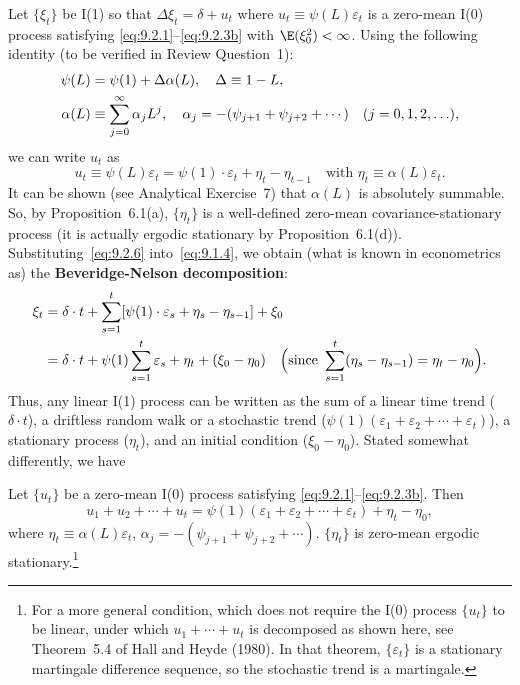 Let $\{\xi_t\}$ be I(1) so that $\Delta \xi_t = \delta + u_t$ where $u_t \equiv \psi(L)\varepsilon_t$ is a zero-mean I(0)
process satisfying \eqref{eq:9.2.1}--\eqref{eq:9.2.3b} with $\E(\xi_0^2) < \infty$. Using the following identity
(to be verified in Review Question~1):
\begin{align}
\psi(L) &= \psi(1) + \Delta \alpha(L), \quad \Delta \equiv 1 - L, \notag \\
\alpha(L) &\equiv \sum_{j=0}^{\infty} \alpha_j L^j, \quad
\alpha_j = -(\psi_{j+1} + \psi_{j+2} + \cdots) \quad (j = 0, 1, 2, \ldots),
\label{eq:9.2.5}
\end{align}
we can write $u_t$ as
\begin{equation}
\label{eq:9.2.6}
u_t \equiv \psi(L)\varepsilon_t = \psi(1) \cdot \varepsilon_t + \eta_t - \eta_{t-1}
\quad \text{with } \eta_t \equiv \alpha(L)\varepsilon_t.
\end{equation}
It can be shown (see Analytical Exercise~7) that $\alpha(L)$ is absolutely summable.
So, by Proposition~6.1(a), $\{\eta_t\}$ is a well-defined zero-mean covariance-stationary
process (it is actually ergodic stationary by Proposition~6.1(d)). Substituting~\eqref{eq:9.2.6}
into~\eqref{eq:9.1.4}, we obtain (what is known in econometrics as) the \textbf{Beveridge-Nelson
decomposition}:
\begin{align}
\xi_t &= \delta \cdot t + \sum_{s=1}^{t}[\psi(1) \cdot \varepsilon_s + \eta_s - \eta_{s-1}] + \xi_0 \notag \\
&= \delta \cdot t + \psi(1) \sum_{s=1}^{t} \varepsilon_s + \eta_t + (\xi_0 - \eta_0)
\quad \Bigl(\text{since } \sum_{s=1}^{t}(\eta_s - \eta_{s-1}) = \eta_t - \eta_0\Bigr).
\label{eq:9.2.7}
\end{align}
Thus, any linear I(1) process can be written as the sum of a linear time trend ($\delta \cdot t$),
a driftless random walk or a stochastic trend ($\psi(1)(\varepsilon_1 + \varepsilon_2 + \cdots + \varepsilon_t)$), a stationary
process ($\eta_t$), and an initial condition ($\xi_0 - \eta_0$). Stated somewhat differently, we
have

\begin{proposition}
\label{prop:9.1}
Let $\{u_t\}$ be a zero-mean
I(0) process satisfying \eqref{eq:9.2.1}--\eqref{eq:9.2.3b}. Then
\[
u_1 + u_2 + \cdots + u_t = \psi(1)(\varepsilon_1 + \varepsilon_2 + \cdots + \varepsilon_t) + \eta_t - \eta_0,
\]
where $\eta_t \equiv \alpha(L)\varepsilon_t$, $\alpha_j = -(\psi_{j+1} + \psi_{j+2} + \cdots)$. $\{\eta_t\}$ is zero-mean ergodic
stationary.\footnote{For a more general condition, which does not require the I(0)
process $\{u_t\}$ to be linear, under which $u_1 + \cdots + u_t$ is decomposed as shown here,
see Theorem~5.4 of Hall and Heyde (1980). In that theorem, $\{\varepsilon_t\}$ is a
stationary martingale difference sequence, so the stochastic trend is a martingale.}
\end{proposition}

